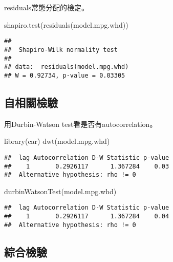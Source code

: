 \documentclass[
]{book}
\newenvironment{Shaded}{\begin{snugshade}}{\end{snugshade}}
\newcommand{\FunctionTok}[1]{\textcolor[rgb]{0.00,0.00,0.00}{#1}}
\newcommand{\NormalTok}[1]{#1}
\begin{document}
residuals常態分配的檢定。

\begin{Shaded}
\begin{Highlighting}[]
\FunctionTok{shapiro.test}\NormalTok{(}\FunctionTok{residuals}\NormalTok{(model.mpg.whd))}
\end{Highlighting}
\end{Shaded}

\begin{verbatim}
## 
##  Shapiro-Wilk normality test
## 
## data:  residuals(model.mpg.whd)
## W = 0.92734, p-value = 0.03305
\end{verbatim}

\hypertarget{ux81eaux76f8ux95dcux6aa2ux9a57}{%
\subsection{自相關檢驗}\label{ux81eaux76f8ux95dcux6aa2ux9a57}}

用Durbin-Watson test看是否有autocorrelation。

\begin{Shaded}
\begin{Highlighting}[]
\FunctionTok{library}\NormalTok{(car)}
\FunctionTok{dwt}\NormalTok{(model.mpg.whd)}
\end{Highlighting}
\end{Shaded}

\begin{verbatim}
##  lag Autocorrelation D-W Statistic p-value
##    1       0.2926117      1.367284    0.03
##  Alternative hypothesis: rho != 0
\end{verbatim}

\begin{Shaded}
\begin{Highlighting}[]
\FunctionTok{durbinWatsonTest}\NormalTok{(model.mpg.whd)}
\end{Highlighting}
\end{Shaded}

\begin{verbatim}
##  lag Autocorrelation D-W Statistic p-value
##    1       0.2926117      1.367284    0.04
##  Alternative hypothesis: rho != 0
\end{verbatim}

\hypertarget{ux7d9cux5408ux6aa2ux9a57}{%
\subsection{綜合檢驗}\label{ux7d9cux5408ux6aa2ux9a57}}
\end{document}
